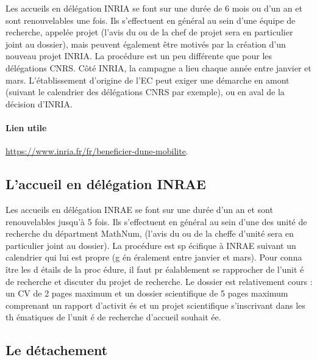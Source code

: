 
Les accueils en d\'el\'egation INRIA se font sur une dur\'ee de 6 mois ou
d'un an et sont renouvelables une fois. Ils s'effectuent en
g\'en\'eral au sein d'une \'equipe de recherche, appel\'ee projet
(l'avis du ou de la chef de projet sera en particulier joint au dossier),
mais peuvent \'egalement \^etre motiv\'es par la cr\'eation d'un
nouveau projet INRIA. La proc\'edure est un peu diff\'erente que
pour les d\'el\'egations CNRS. C\^ot\'e INRIA, la campagne a lieu chaque ann\'ee entre janvier et mars.
L'\'etablissement d'origine de l'EC peut exiger une d\'emarche en amont (suivant le calendrier des d\'el\'egations CNRS par exemple), 
ou en aval de la d\'ecision d'INRIA.

\vspace{-.5\baselineskip}
\paragraph*{Lien utile}\url{https://www.inria.fr/fr/beneficier-dune-mobilite}.

\subsection*{L'accueil en d\'el\'egation INRAE}

Les accueils en d\'el\'egation INRAE se font sur une dur\'ee d'un an et sont renouvelables jusqu'à 5 fois. Ils s'effectuent en
g\'en\'eral au sein d'une des unit\'e de recherche du d\'epartment MathNum, 
(l'avis du ou de la chef\mp fe d'unit\'e sera en particulier joint au dossier). La proc\'edure est sp \'ecifique à INRAE suivant un calendrier qui lui est propre (g \'en \'eralement entre janvier et mars). Pour conna \^itre les d \'etails de la proc \'edure, il faut pr \'ealablement se rapprocher de l'unit \'e de recherche et discuter du projet de recherche. Le dossier est relativement cours : un CV de 2 pages maximum et un dossier scientifique de 5 pages maximum comprenant un rapport d'activit \'es et un projet scientifique s'inscrivant dans les th \'ematiques de l'unit \'e de recherche d'accueil souhait \'ee.


\subsection{Le d\'etachement}
\label{detachement}


